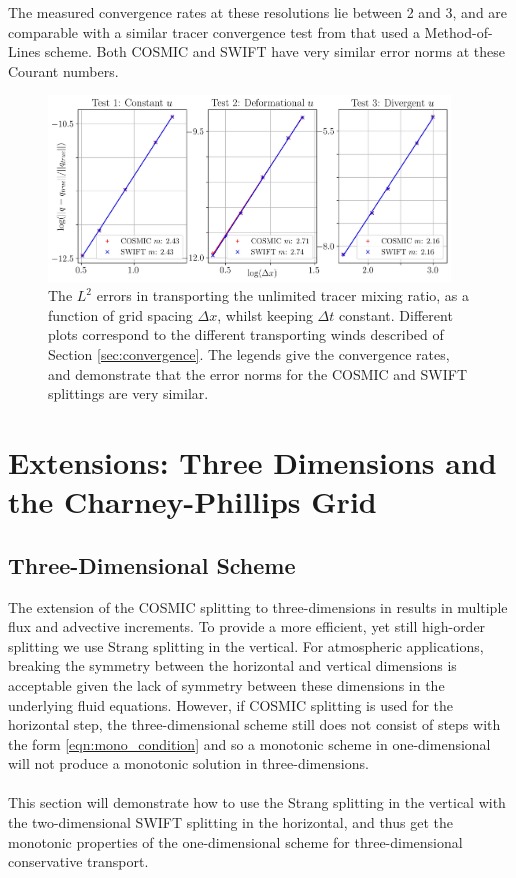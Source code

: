 \documentclass[11pt,a4paper]{article}
\begin{document}
The measured convergence rates at these resolutions lie between 2 and 3, and are comparable with a similar tracer convergence test from \citet{bendall2023solution} that used a Method-of-Lines scheme.
Both COSMIC and SWIFT have very similar error norms at these Courant numbers.
\begin{figure}[h!]
\centering
\includegraphics[width=0.95\textwidth]{fig_6_convergence.jpg}
\caption{The $L^2$ errors in transporting the unlimited tracer mixing ratio, as a function of grid spacing $\Delta x$, whilst keeping $\Delta t$ constant.
Different plots correspond to the different transporting winds described of Section \ref{sec:convergence}.
The legends give the convergence rates, and demonstrate that the error norms for the COSMIC and SWIFT splittings are very similar.
}
\label{fig:convergence_const_dt}
\end{figure}

\section{Extensions: Three Dimensions and the Charney-Phillips Grid} \label{sec:3D}
\subsection{Three-Dimensional Scheme}
The extension of the COSMIC splitting to three-dimensions in \cite{leonard1996cosmic} results in multiple flux and advective increments.
To provide a more efficient, yet still high-order splitting we use Strang splitting \citep{strang1968spltting} in the vertical.
For atmospheric applications, breaking the symmetry between the horizontal and vertical dimensions is acceptable given the lack of symmetry between these dimensions in the underlying fluid equations.
However, if COSMIC splitting is used for the horizontal step, the three-dimensional scheme still does not consist of steps with the form \eqref{eqn:mono_condition} and so a monotonic scheme in one-dimensional will not produce a monotonic solution in three-dimensions.
\\
\\
This section will demonstrate how to use the Strang splitting in the vertical with the two-dimensional SWIFT splitting in the horizontal, and thus get the monotonic properties of the one-dimensional scheme for three-dimensional conservative transport.
\end{document}
